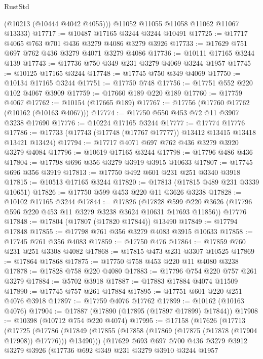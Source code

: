 \begin{lexlean}{RustStd}
\begin{coremodule}
        (@10213 (@10444 @4042 @4055)))
      @11052
      @11055
      @11058
      @11062
      @11067
      @13333)
@17717 := @10487 @17165 @3244 @3244 @10491
@17725 := @17717 @4065 @763 @701 @436 @3279 @4086 @3279 @3926
@17733 := @17629 @751 @697 @762 @436 @3279 @4071 @3279 @4086
@17736 := @10111 @17165 @3244 @139
@17743 := @17736 @750 @349 @231 @3279 @4069 @3244 @1957
@17745 := @10125 @17165 @3244
@17748 := @17745 @750 @349 @4069
@17750 := @10134 @17165 @3244
@17751 := @17750 @748
@17756 := @17751 @552 @220 @102 @4067 @3909
@17759 := @17660 @189 @220 @189
@17760 := @17759 @4067
@17762 := @10154 (@17665 @189)
@17767 := @17756 (@17760 @17762 (@10162 (@10163 @4067)))
@17774 := @17750 @550 @453 @72 @11 @3907 @3238 @17690
@17776 := @10224 @17165 @3244
@17777 := @17774 @17776
@17786 := @17733 (@17743 (@17748 (@17767 @17777)) @13412 @13415 @13418 @13421 @13424)
@17794 := @17717 @4071 @697 @762 @436 @3279 @3920 @3279 @4084
@17796 := @10619 @17165 @3244
@17798 := @17796 @486 @436
@17804 := @17798 @696 @356 @3279 @3919 @3915 @10633
@17807 := @17745 @696 @356 @3919
@17813 := @17750 @492 @601 @231 @251 @3340 @3918
@17815 := @10513 @17165 @3244
@17820 := @17813 (@17815 @489 @231 @3339 @10651)
@17826 := @17750 @599 @453 @220 @11 @3626 @3238
@17828 := @10102 @17165 @3244
@17844 := @17826
    (@17828 @599 @220 @3626 (@17796 @596 @220 @453 @11 @3279 @3238 @3624 @10631 @17693 @11856))
    @17776
@17848 := @17804 (@17807 (@17820 @17844)) @13490
@17849 := @17794 @17848
@17855 := @17798 @761 @356 @3279 @4083 @3915 @10633
@17858 := @17745 @761 @356 @4083
@17859 := @17750 @476
@17864 := @17859 @760 @231 @251 @3308 @4082
@17868 := @17815 @473 @231 @3307 @10525
@17869 := @17864 @17868
@17875 := @17750 @758 @453 @220 @11 @4080 @3238
@17878 := @17828 @758 @220 @4080
@17883 := @17796 @754 @220 @757 @261 @3279
@17884 := @5702 @3918
@17887 := @17883 @17884 @4074 @11509
@17890 := @17745 @757 @261 @17884
@17895 := @17751 @601 @220 @251 @4076 @3918
@17897 := @17759 @4076 @17762
@17899 := @10162 (@10163 @4076)
@17904 := @17887 (@17890 (@17895 (@17897 @17899) @17844))
@17908 := @10398 (@10712 @754 @220 @4074)
@17995 := @17158
    (@17626
      (@17713
        (@17725
          (@17786
            (@17849 (@17855 (@17858 (@17869 (@17875 (@17878 (@17904 @17908)) @17776))) @13490)))
          (@17629
            @693
            @697
            @700
            @436
            @3279
            @3912
            @3279
            @3926
            (@17736
              @692
              @349
              @231
              @3279
              @3910
              @3244
              @1957

\end{coremodule}
\end{lexlean}
